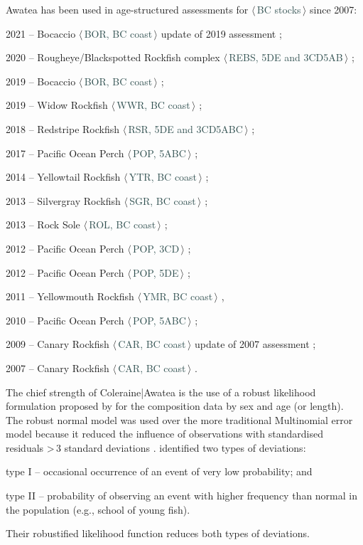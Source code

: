 \documentclass[11pt]{book}
\newcommand{\stock}[1]{$\langle$\,\textcolor{darkslategrey}{#1}\,$\rangle$}
\begin{document}
Awatea has been used in age-structured assessments for \stock{BC stocks} since 2007:
\begin{itemize_csas}{}{}
  \item 2021 -- Bocaccio \stock{BOR, BC coast} update of 2019 assessment \citep{DFO-SR:2022_bor};
  \item 2020 -- Rougheye/Blackspotted Rockfish complex \stock{REBS, 5DE and 3CD5AB} \citep{Starr-Haigh:2022_rebs};
  \item 2019 -- Bocaccio \stock{BOR, BC coast} \citep{Starr-Haigh:2022_bor};
  \item 2019 -- Widow Rockfish \stock{WWR, BC coast} \citep{Starr-Haigh:2021_wwr};
  \item 2018 -- Redstripe Rockfish \stock{RSR, 5DE and 3CD5ABC} \citep{Starr-Haigh:2021_rsr};
  \item 2017 -- Pacific Ocean Perch \stock{POP, 5ABC} \citep{Haigh-etal:2018_pop5ABC};
  \item 2014 -- Yellowtail Rockfish \stock{YTR, BC coast} \citep{DFO-SAR:2015_ytr};
  \item 2013 -- Silvergray Rockfish \stock{SGR, BC coast} \citep{Starr-etal:2016_sgr};
  \item 2013 -- Rock Sole \stock{ROL, BC coast} \citep{Holt-etal:2016_rol};
  \item 2012 -- Pacific Ocean Perch \stock{POP, 3CD} \citep{Edwards-etal:2014_pop3CD};
  \item 2012 -- Pacific Ocean Perch \stock{POP, 5DE} \citep{Edwards-etal:2014_pop5DE};
  \item 2011 -- Yellowmouth Rockfish \stock{YMR, BC coast} \citep{Edwards-etal:2012_ymr},
  \item 2010 -- Pacific Ocean Perch \stock{POP, 5ABC} \citep{Edwards-etal:2012_pop5ABC};
  \item 2009 -- Canary Rockfish \stock{CAR, BC coast} update of 2007 assessment \citep{DFO-SR:2009_car};
  \item 2007 -- Canary Rockfish \stock{CAR, BC coast} \citep{Stanley-etal:2009_car}.
\end{itemize_csas}

The chief strength of Coleraine|Awatea is the use of a robust likelihood formulation proposed by \citet{Fournier-etal:1998} for the composition data by sex and age (or length).
The robust normal model was used over the more traditional Multinomial error model because it reduced the influence of observations with standardised residuals >\,3 standard deviations \citep{Fournier-etal:1990}.
\citet{Fournier-etal:1990} identified two types of deviations:
\begin{itemize_csas}{}{}
	\item type I -- occasional occurrence of an event of very low probability; and
	\item type II -- probability of observing an event with higher frequency than normal in the population (e.g., school of young fish).
\end{itemize_csas}
Their robustified likelihood function reduces both types of deviations.
\end{document}
